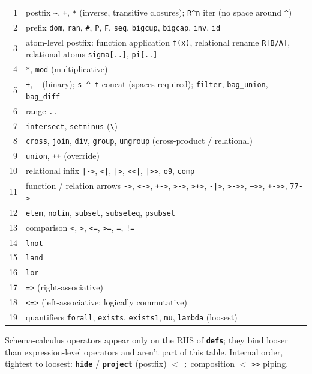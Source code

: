 \documentclass[10pt,landscape,a4paper]{article}
\newcommand{\kw}[1]{\texttt{\bfseries #1}}
\begin{document}
\begin{tabularx}{\textwidth}{rX}
1  & postfix \texttt{\textasciitilde}, \texttt{+}, \texttt{*} (inverse, transitive closures); \texttt{R\^{}n} iter (no space around \texttt{\^{}}) \\
2  & prefix \texttt{dom}, \texttt{ran}, \texttt{\#}, \texttt{P}, \texttt{F}, \texttt{seq}, \texttt{bigcup}, \texttt{bigcap}, \texttt{inv}, \texttt{id} \\
3  & atom-level postfix: function application \texttt{f(x)}, relational rename \texttt{R[B/A]}, relational atoms \texttt{sigma[..]}, \texttt{pi[..]} \\
4  & \texttt{*}, \texttt{mod} (multiplicative) \\
5  & \texttt{+}, \texttt{-} (binary); \texttt{s\ \^{}\ t} concat (spaces required); \texttt{filter}, \texttt{bag\_union}, \texttt{bag\_diff} \\
6  & range \texttt{..} \\
7  & \texttt{intersect}, \texttt{setminus} (\texttt{\textbackslash}) \\
8  & \texttt{cross}, \texttt{join}, \texttt{div}, \texttt{group}, \texttt{ungroup} (cross-product / relational) \\
9  & \texttt{union}, \texttt{++} (override) \\
10 & relational infix \texttt{|->}, \texttt{<|}, \texttt{|>}, \texttt{<<|}, \texttt{|>>}, \texttt{o9}, \texttt{comp} \\
11 & function / relation arrows \texttt{->}, \texttt{<->}, \texttt{+->}, \texttt{>->}, \texttt{>+>}, \texttt{-|>}, \texttt{>->>}, \texttt{-->>}, \texttt{+->>}, \texttt{77->} \\
12 & \texttt{elem}, \texttt{notin}, \texttt{subset}, \texttt{subseteq}, \texttt{psubset} \\
13 & comparison \texttt{<}, \texttt{>}, \texttt{<=}, \texttt{>=}, \texttt{=}, \texttt{!=} \\
14 & \texttt{lnot} \\
15 & \texttt{land} \\
16 & \texttt{lor} \\
17 & \texttt{=>} (right-associative) \\
18 & \texttt{<=>} (left-associative; logically commutative) \\
19 & quantifiers \texttt{forall}, \texttt{exists}, \texttt{exists1}, \texttt{mu}, \texttt{lambda} (loosest) \\
\end{tabularx}

{\scriptsize Schema-calculus operators appear only on the RHS of \kw{defs}; they bind looser than expression-level operators and aren't part of this table.  Internal order, tightest to loosest: \kw{hide} / \kw{project} (postfix) $<$ \texttt{;} composition $<$ \texttt{>{}>} piping.}
\end{document}
